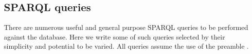 																																																																																																																																																																																																																																																																																																																																																																																																																																																																				\subsection{SPARQL queries}\label{queries}
																																																																																																																																																																																																																																																																																																																																																																																																																																																																				There are numerous useful and general purpose SPARQL queries to be performed against the database.
																																																																																																																																																																																																																																																																																																																																																																																																																																																																				Here we write some of such queries selected by their simplicity and potential to be varied.
																																																																																																																																																																																																																																																																																																																																																																																																																																																																				All queries assume the use of the preamble .
